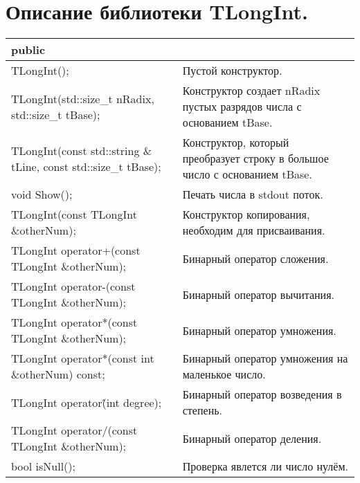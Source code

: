 \documentclass[pdf, unicode, 12pt, a4paper,oneside,fleqn]{article}
\begin{document}
\section{Описание библиотеки TLongInt.}
\begin{longtable}{|p{8.92cm}|p{8.0cm}|}
\hline
\rowcolor{lightgray}

\multicolumn{2}{|c|} {public}\\
\hline
TLongInt(); &Пустой конструктор.\\
TLongInt(std::size\_t nRadix, std::size\_t tBase);&Конструктор создает nRadix пустых разрядов числа с основанием tBase.\\
TLongInt(const std::string \& tLine, const std::size\_t tBase);&Конструктор, который преобразует строку в большое число с основанием tBase.\\

void Show();&Печать числа в stdout поток.\\

TLongInt(const TLongInt \&otherNum);&Конструктор копирования, необходим для присваивания.\\

\hline
TLongInt operator+(const TLongInt \&otherNum);&Бинарный оператор сложения.\\

TLongInt operator-(const TLongInt \&otherNum);&Бинарный оператор вычитания.\\

TLongInt operator*(const TLongInt \&otherNum);&Бинарный оператор умножения.\\
TLongInt operator*(const int \&otherNum) const;&Бинарный оператор умножения на маленькое число.\\

TLongInt operator\^(int degree);&Бинарный оператор возведения в степень.\\

TLongInt operator/(const TLongInt \&otherNum);&Бинарный оператор деления.\\


bool isNull();&Проверка явлется ли число нулём.\\


\end{longtable}
\end{document}
